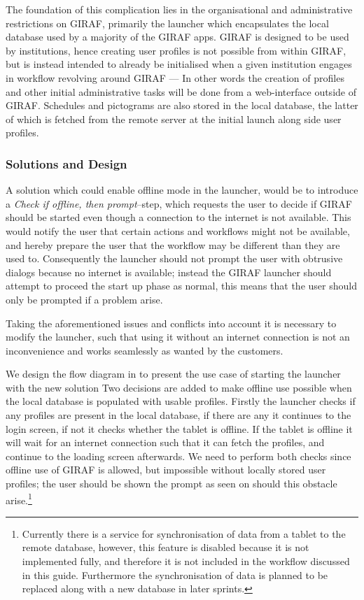 The foundation of this complication lies in the organisational and administrative restrictions on GIRAF, primarily the launcher which encapsulates the local database used by a majority of the GIRAF apps.
GIRAF is designed to be used by institutions, hence creating user profiles is not possible from within GIRAF, but is instead intended to already be initialised when a given institution engages in workflow revolving around GIRAF --- In other words the creation of profiles and other initial administrative tasks will be done from a web-interface outside of GIRAF.
Schedules and pictograms are also stored in the local database, the latter of which is fetched from the remote server at the initial launch along side user profiles.

\subsubsection{Solutions and Design}
A solution which could enable offline mode in the launcher, would be to introduce a \textit{Check if offline, then prompt}--step, which requests the user to decide if GIRAF should be started even though a connection to the internet is not available.
This would notify the user that certain actions and workflows might not be available, and hereby prepare the user that the workflow may be different than they are used to.
Consequently the launcher should not prompt the user with obtrusive dialogs because no internet is available; instead the GIRAF launcher should attempt to proceed the start up phase as normal, this means that the user should only be prompted if a problem arise.

\bigskip \noindent
Taking the aforementioned issues and conflicts into account it is necessary to modify the launcher, such that using it without an internet connection is not an inconvenience and works seamlessly as wanted by the customers. 

We design the flow diagram in  to present the use case of starting the launcher with the new solution
Two decisions are added to make offline use possible when the local database is populated with usable profiles.
Firstly the launcher checks if any profiles are present in the local database, if there are any it continues to the login screen, if not it checks whether the tablet is offline. 
If the tablet is offline it will wait for an internet connection such that it can fetch the profiles, and continue to the loading screen afterwards.
We need to perform both checks since offline use of GIRAF is allowed, but impossible without locally stored user profiles; the user should be shown the prompt as seen on  should this obstacle arise.\footnote{Currently there is a service for synchronisation of data from a tablet to the remote database, however, this feature is disabled because it is not implemented fully, and therefore it is not included in the workflow discussed in this guide. Furthermore the synchronisation of data is planned to be replaced along with a new database in later sprints.}

